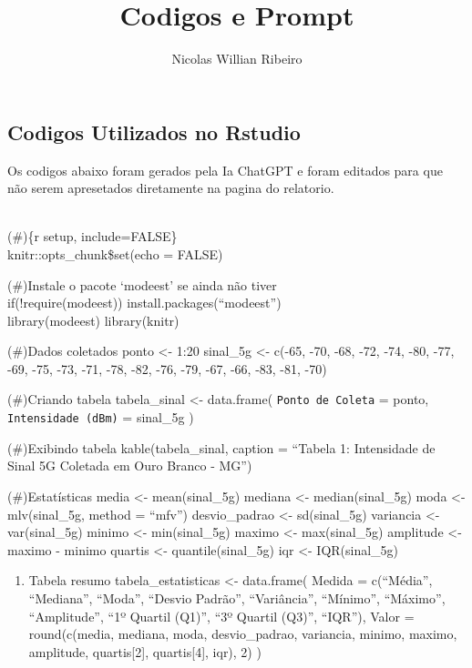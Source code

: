 \documentclass[
  letterpaper,
  DIV=11,
  numbers=noendperiod]{scrartcl}
\title{Codigos e Prompt}
\author{Nicolas Willian Ribeiro}
\date{}
\providecommand{\tightlist}{%
  \setlength{\itemsep}{0pt}\setlength{\parskip}{0pt}}\usepackage{longtable,booktabs,array}
\begin{document}
\maketitle


\subsection{Codigos Utilizados no
Rstudio}\label{codigos-utilizados-no-rstudio}

Os codigos abaixo foram gerados pela Ia ChatGPT e foram editados para
que não serem apresetados diretamente na pagina do relatorio.\\
\strut \\
(\#)\{r setup, include=FALSE\}\\
knitr::opts\_chunk\$set(echo = FALSE)

(\#)Instale o pacote `modeest' se ainda não tiver\\
if(!require(modeest)) install.packages(``modeest'')\\
library(modeest) library(knitr)

(\#)Dados coletados ponto \textless- 1:20 sinal\_5g \textless- c(-65,
-70, -68, -72, -74, -80, -77, -69, -75, -73, -71, -78, -82, -76, -79,
-67, -66, -83, -81, -70)

(\#)Criando tabela tabela\_sinal \textless- data.frame(
\texttt{Ponto\ de\ Coleta} = ponto, \texttt{Intensidade\ (dBm)} =
sinal\_5g )

(\#)Exibindo tabela kable(tabela\_sinal, caption = ``Tabela 1:
Intensidade de Sinal 5G Coletada em Ouro Branco - MG'')

(\#)Estatísticas media \textless- mean(sinal\_5g) mediana \textless-
median(sinal\_5g) moda \textless- mlv(sinal\_5g, method = ``mfv'')
desvio\_padrao \textless- sd(sinal\_5g) variancia \textless-
var(sinal\_5g) minimo \textless- min(sinal\_5g) maximo \textless-
max(sinal\_5g) amplitude \textless- maximo - minimo quartis \textless-
quantile(sinal\_5g) iqr \textless- IQR(sinal\_5g)

\begin{enumerate}
\def\labelenumi{(\arabic{enumi})}
\tightlist
\item
  Tabela resumo tabela\_estatisticas \textless- data.frame( Medida =
  c(``Média'', ``Mediana'', ``Moda'', ``Desvio Padrão'', ``Variância'',
  ``Mínimo'', ``Máximo'', ``Amplitude'', ``1º Quartil (Q1)'', ``3º
  Quartil (Q3)'', ``IQR''), Valor = round(c(media, mediana, moda,
  desvio\_padrao, variancia, minimo, maximo, amplitude, quartis{[}2{]},
  quartis{[}4{]}, iqr), 2) )
\end{enumerate}
\end{document}
